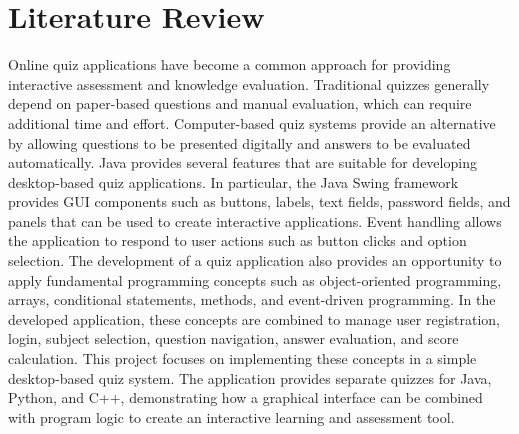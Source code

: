 \documentclass[11pt,a4paper]{report}  %
\begin{document}
\section{Literature Review}
Online quiz applications have become a common approach for providing interactive assessment and knowledge evaluation. Traditional quizzes generally depend on paper-based questions and manual evaluation, which can require additional time and effort. Computer-based quiz systems provide an alternative by allowing questions to be presented digitally and answers to be evaluated automatically.
Java provides several features that are suitable for developing desktop-based quiz applications. In particular, the Java Swing framework provides GUI components such as buttons, labels, text fields, password fields, and panels that can be used to create interactive applications. Event handling allows the application to respond to user actions such as button clicks and option selection.
The development of a quiz application also provides an opportunity to apply fundamental programming concepts such as object-oriented programming, arrays, conditional statements, methods, and event-driven programming. In the developed application, these concepts are combined to manage user registration, login, subject selection, question navigation, answer evaluation, and score calculation.
This project focuses on implementing these concepts in a simple desktop-based quiz system. The application provides separate quizzes for Java, Python, and C++, demonstrating how a graphical interface can be combined with program logic to create an interactive learning and assessment tool.
\end{document}
